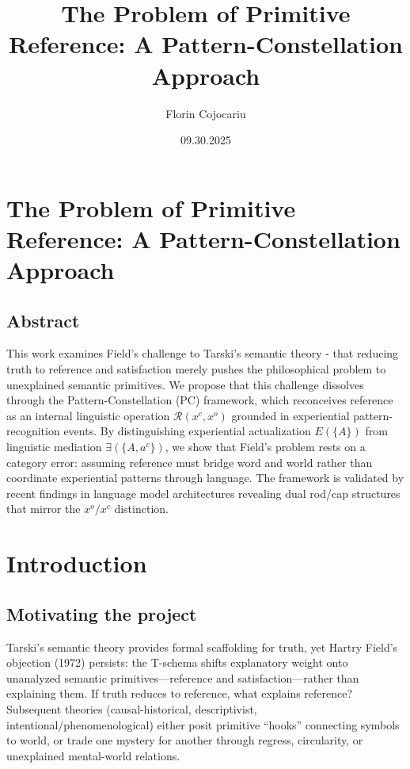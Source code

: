 \documentclass[12pt]{article}
\title{The Problem of Primitive Reference: A Pattern-Constellation Approach}
\author{Florin Cojocariu}
\date{09.30.2025}
\begin{document}
\maketitle
\clearpage
\tableofcontents
\setcounter{tocdepth}{3}
\clearpage
\section{The Problem of Primitive Reference: A Pattern-Constellation Approach}\label{the-problem-of-primitive-reference-a-pattern-constellation-approach}

\subsection{Abstract}\label{abstract}

This work examines Field's challenge to Tarski's semantic theory - that reducing truth to reference and satisfaction merely pushes the philosophical problem to unexplained semantic primitives. We propose that this challenge dissolves through the Pattern-Constellation (PC) framework, which reconceives reference as an internal linguistic operation \(\mathcal{R}(x^c, x^o)\) grounded in experiential pattern-recognition events. By distinguishing experiential actualization \(E(\{A\})\) from linguistic mediation \(\exists(\{A, a^c\})\), we show that Field's problem rests on a category error: assuming reference must bridge word and world rather than coordinate experiential patterns through language. The framework is validated by recent findings in language model architectures revealing dual rod/cap structures that mirror the \(x^o/x^c\) distinction.

\section{Introduction}\label{introduction}

\subsection{Motivating the project}\label{motivating-the-project}

Tarski's semantic theory provides formal scaffolding for truth, yet Hartry Field's objection (1972) persists: the T-schema shifts explanatory weight onto unanalyzed semantic primitives---reference and satisfaction---rather than explaining them. If truth reduces to reference, what explains reference? Subsequent theories (causal-historical, descriptivist, intentional/phenomenological) either posit primitive ``hooks'' connecting symbols to world, or trade one mystery for another through regress, circularity, or unexplained mental-world relations.
\end{document}
